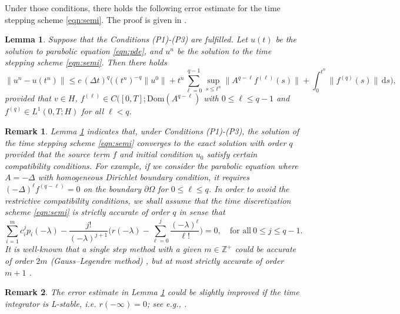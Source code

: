 \documentclass[a4paper, oneside]{book}
\def\d{{\mathrm{d}}}
\def\d{\mathrm{d}}
\newtheorem{remark}{Remark}[section]
\newtheorem{lemma}{Lemma}[section]
\begin{document}
Under those conditions, there holds the following error estimate for the time stepping scheme \eqref{eqn:semi}.
The proof is given in \cite[Theorems 7.2 and 8.3]{Thomee:2006}.
\begin{lemma}\label{lem:conv-00}
Suppose that the Conditions (P1)-(P3) are fulfilled.
Let $u(t)$ be the solution to parabolic equation \eqref{eqn:pde}, and $u^n$
be the solution to the time stepping scheme \eqref{eqn:semi}. Then there holds
\begin{equation*}%
\|u^n - u(t^n)\|\leq
c\, (\Delta t)^q \Big( {(t^n)}^{-q} \| u^0 \|
+ t^n \sum_{\ell=0}^{q-1} \sup_{s\le t^n} \| A^{q-\ell}f^{(\ell)}(s)  \| + \int_0^{t^n}
\| f^{(q)}(s) \|\,\d s\Big),
\end{equation*}
provided that $v \in H$, $f^{(\ell)}\in C([0,T];\text{Dom}(A^{q-\ell})$ with $0\le \ell\le q-1$ and $f^{(q)} \in L^1(0,T; H)$ for all $\ell<q$.
\end{lemma}

\begin{remark}\label{rem:conv-00}
Lemma \ref{lem:conv-00} indicates that, under Conditions (P1)-(P3), the
solution of the time stepping scheme \eqref{eqn:semi} converges to the exact solution with order $q$
provided that the source term $f$ and initial condition $u_0$
satisfy certain compatibility conditions.
For example, if we consider the parabolic equation where  $A=-\Delta$ with homogeneous Dirichlet boundary condition,
it requires
$(-\Delta)^{\ell} f^{(q-\ell)}= 0$ on the boundary $\partial\Omega$ for $0\le \ell\le q$.
In order to avoid the restrictive compatibility conditions, we shall assume that the time discretization scheme \eqref{eqn:semi} is \textsl{strictly accurate} of order $q$ in sense that
$$ \sum_{i=1}^m c_i^j p_i(-\lambda) - \frac{j!}{(-\lambda)^{j+1}}\Big( r (-\lambda)
- \sum_{\ell=0}^j \frac{(-\lambda)^\ell}{\ell!}\Big) =0,\quad\text{for all}~ 0\le j\le q-1. $$
It is well-known that a single step method
with a given $m \in \mathbb{Z}^+$ could be accurate of order $2m$ (Gauss--Legendre method) \cite[Section 2.2]{Ehle:thesis},
but at most strictly accurate of order $m+1$ \cite[Lemma 5]{BrennerCrouzeixThomee:1982}.
\end{remark}


\begin{remark}\label{rem:conv-01}
The error estimate in Lemma \ref{lem:conv-00} could be slightly improved if the time integrator is L-stable, i.e. $r(-\infty) =0$; see e.g., \cite[Theorem 7.2]{Thomee:2006}.
\end{remark}
\end{document}
